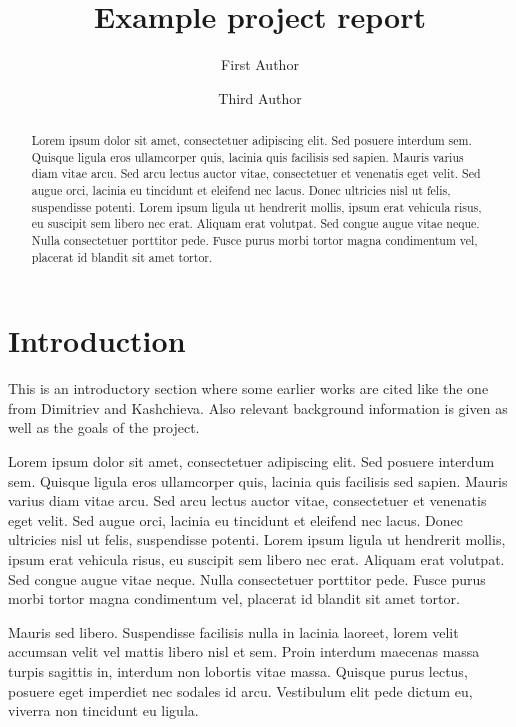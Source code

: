 \documentclass{prace}
\title{Example project report}
\author[1]{First Author}
\author[1,2]{Third Author}
\affiliation{Example University, Science Sq. 1, A City 01010, Random Country}
\affiliation{Institute for Advanced Examples, Factlane 11, Nosuchcity 12345,
Someland}
\begin{document}
\maketitle

\begin{abstract}
Lorem ipsum dolor sit amet, consectetuer adipiscing elit. Sed posuere interdum
sem. Quisque ligula eros ullamcorper quis, lacinia quis facilisis sed sapien.
Mauris varius diam vitae arcu. Sed arcu lectus auctor vitae, consectetuer et
venenatis eget velit. Sed augue orci, lacinia eu tincidunt et eleifend nec
lacus. Donec ultricies nisl ut felis, suspendisse potenti. Lorem ipsum ligula
ut hendrerit mollis, ipsum erat vehicula risus, eu suscipit sem libero nec
erat. Aliquam erat volutpat. Sed congue augue vitae neque. Nulla consectetuer
porttitor pede. Fusce purus morbi tortor magna condimentum vel, placerat id
blandit sit amet tortor.
\end{abstract}

\section{Introduction}
This is an introductory section where some earlier
works\cite{scholes-DiscussFaradaySoc-70, mazurin-Phase-Separation-in-Glass-84} 
are cited like the one from Dimitriev and 
Kashchieva\cite{dimitriev-JMaterSci-75}. Also relevant 
background information is given as well as the goals of the project.

Lorem ipsum dolor sit amet, consectetuer adipiscing elit. Sed posuere interdum
sem. Quisque ligula eros ullamcorper quis, lacinia quis facilisis sed sapien.
Mauris varius diam vitae arcu. Sed arcu lectus auctor vitae, consectetuer et
venenatis eget velit. Sed augue orci, lacinia eu tincidunt et eleifend nec
lacus. Donec ultricies nisl ut felis, suspendisse potenti. Lorem ipsum ligula
ut hendrerit mollis, ipsum erat vehicula risus, eu suscipit sem libero nec
erat. Aliquam erat volutpat. Sed congue augue vitae neque. Nulla consectetuer
porttitor pede. Fusce purus morbi tortor magna condimentum vel, placerat id
blandit sit amet tortor.

Mauris sed libero. Suspendisse facilisis nulla in lacinia laoreet, lorem velit
accumsan velit vel mattis libero nisl et sem. Proin interdum maecenas massa
turpis sagittis in, interdum non lobortis vitae massa. Quisque purus lectus,
posuere eget imperdiet nec sodales id arcu. Vestibulum elit pede dictum eu,
viverra non tincidunt eu ligula.
\end{document}
